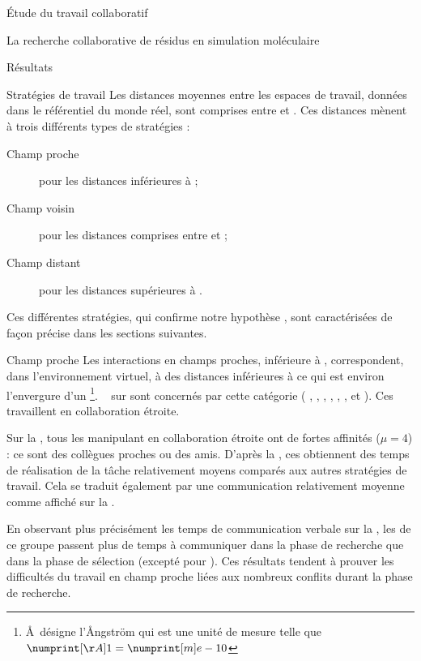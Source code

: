 \documentclass[myfrancais]{mythesis}
\begin{document}
\begin{mypart}{Étude du travail collaboratif}
\begin{mychapter}{La recherche collaborative de résidus en simulation moléculaire}
\begin{mysection}{Résultats}
\begin{mysubsection}{Stratégies de travail}
					Les distances moyennes entre les espaces de travail, données dans le référentiel du monde réel, sont comprises entre  et .
					Ces distances mènent à trois différents types de stratégies :
					\begin{description}
						\item[Champ proche] pour les distances inférieures à ;
						\item[Champ voisin] pour les distances comprises entre  et ;
						\item[Champ distant] pour les distances supérieures à .
					\end{description}

					Ces différentes stratégies, qui confirme notre hypothèse , sont caractérisées de façon précise dans les sections suivantes.

					\begin{mysubsubsection}{Champ proche}
						Les interactions en champs proches, inférieure à , correspondent, dans l'environnement virtuel, à des distances inférieures à  ce qui est environ l'envergure d'un \footnote{\AA\ désigne l'\AA ngström qui est une unité de mesure telle que $\mynum[\AA]{1} = \mynum[m]{e-10}$}.
						~ sur  sont concernés par cette catégorie ( , , , , , ,  et ).
						Ces  travaillent en collaboration étroite.

						Sur la , tous les  manipulant en collaboration étroite ont de fortes affinités ($\mu = 4$) : ce sont des collègues proches ou des amis.
						D'après la , ces  obtiennent des temps de réalisation de la tâche relativement moyens comparés aux autres stratégies de travail.
						Cela se traduit également par une communication relativement moyenne comme affiché sur la .

						En observant plus précisément les temps de communication verbale sur la , les  de ce groupe passent plus de temps à communiquer dans la phase de recherche que dans la phase de sélection (excepté pour ).
						Ces résultats tendent à prouver les difficultés du travail en champ proche liées aux nombreux conflits durant la phase de recherche.


\end{mysubsubsection}
\end{mysubsection}
\end{mysection}
\end{mychapter}
\end{mypart}
\end{document}
